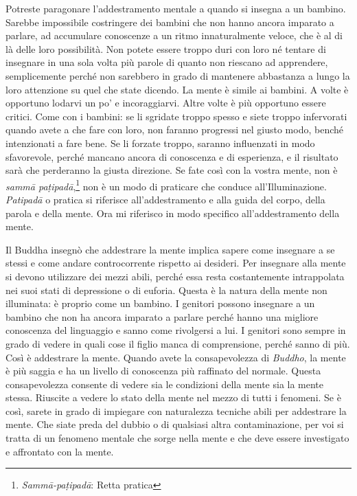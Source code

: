 Potreste paragonare l'addestramento mentale a quando si insegna a un
bambino. Sarebbe impossibile costringere dei bambini che non hanno
ancora imparato a parlare, ad accumulare conoscenze a un ritmo
innaturalmente veloce, che è al di là delle loro possibilità. Non potete
essere troppo duri con loro né tentare di insegnare in una sola volta
più parole di quanto non riescano ad apprendere, semplicemente perché
non sarebbero in grado di mantenere abbastanza a lungo la loro
attenzione su quel che state dicendo. La mente è simile ai bambini. A
volte è opportuno lodarvi un po' e incoraggiarvi. Altre volte è più
opportuno essere critici. Come con i bambini: se li sgridate troppo
spesso e siete troppo infervorati quando avete a che fare con loro, non
faranno progressi nel giusto modo, benché intenzionati a fare bene. Se
li forzate troppo, saranno influenzati in modo sfavorevole, perché
mancano ancora di conoscenza e di esperienza, e il risultato sarà che
perderanno la giusta direzione. Se fate così con la vostra mente, non è
\emph{sammā paṭipadā},\footnote{\emph{Sammā-paṭipadā}: Retta pratica}
non è un modo di praticare che conduce all'Illuminazione.
\emph{Patipadā} o pratica si riferisce all'addestramento e alla guida
del corpo, della parola e della mente. Ora mi riferisco in modo
specifico all'addestramento della mente.

Il Buddha insegnò che addestrare la mente implica sapere come insegnare
a se stessi e come andare controcorrente rispetto ai desideri. Per
insegnare alla mente si devono utilizzare dei mezzi abili, perché essa
resta costantemente intrappolata nei suoi stati di depressione o di
euforia. Questa è la natura della mente non illuminata: è proprio come
un bambino. I genitori possono insegnare a un bambino che non ha ancora
imparato a parlare perché hanno una migliore conoscenza del linguaggio e
sanno come rivolgersi a lui. I genitori sono sempre in grado di vedere
in quali cose il figlio manca di comprensione, perché sanno di più. Così
è addestrare la mente. Quando avete la consapevolezza di \emph{Buddho},
la mente è più saggia e ha un livello di conoscenza più raffinato del
normale. Questa consapevolezza consente di vedere sia le condizioni
della mente sia la mente stessa. Riuscite a vedere lo stato della mente
nel mezzo di tutti i fenomeni. Se è così, sarete in grado di impiegare
con naturalezza tecniche abili per addestrare la mente. Che siate preda
del dubbio o di qualsiasi altra contaminazione, per voi si tratta di un
fenomeno mentale che sorge nella mente e che deve essere investigato e
affrontato con la mente.

